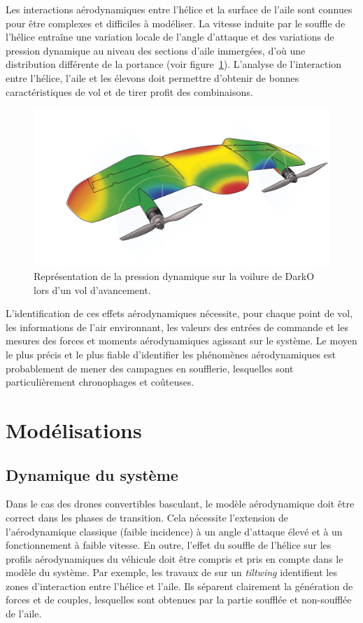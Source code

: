     Les interactions aérodynamiques entre l'hélice et la surface de l'aile sont connues pour être complexes et difficiles à modéliser. La vitesse induite par le souffle de l'hélice entraîne une variation locale de l'angle d'attaque et des variations de pression dynamique au niveau des sections d'aile immergées, d'où une distribution différente de la portance (voir figure~\ref{fig:darkoAirPress}). L'analyse de l'interaction entre l'hélice, l'aile et les élevons doit permettre d'obtenir de bonnes caractéristiques de vol et de tirer profit des combinaisons.

    \begin{figure}[ht!]
        \centering
            \includegraphics[width=0.6\columnwidth]{figures/Darko-air-pressure.png}
            \caption{Représentation de la pression dynamique sur la voilure de DarkO lors d'un vol d'avancement.}
            \label{fig:darkoAirPress}
    \end{figure}

     L'identification de ces effets aérodynamiques nécessite, pour chaque point de vol, les informations de l'air environnant, les valeurs des entrées de commande et les mesures des forces et moments aérodynamiques agissant sur le système. Le moyen le plus précis et le plus fiable d'identifier les phénomènes aérodynamiques est probablement de mener des campagnes en soufflerie, lesquelles sont particulièrement chronophages et coûteuses.


\section{Modélisations}
\label{sec:modelisation}

\subsection{Dynamique du système}
Dans le cas des drones convertibles basculant, le modèle aérodynamique doit être correct dans les phases de transition. Cela nécessite l'extension de l'aérodynamique classique (faible incidence) à un angle d'attaque élevé et à un fonctionnement à faible vitesse. En outre, l'effet du souffle de l'hélice sur les profils aérodynamiques du véhicule doit être compris et pris en compte dans le modèle du système. Par exemple, les travaux de \cite{9444145} sur un \textit{tiltwing} identifient les zones d'interaction entre l'hélice et l'aile. Ils séparent clairement la génération de forces et de couples, lesquelles sont obtenues par la partie soufflée et non-soufflée de l'aile.

